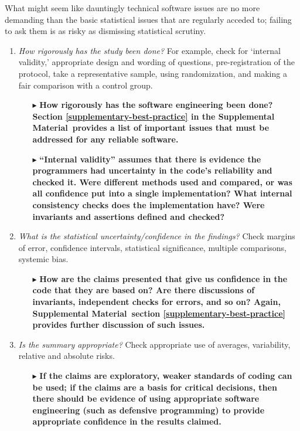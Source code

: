 \documentclass{article}
\def\supplement{Supplemental Material}
\begin{document}
What might seem like dauntingly technical software issues are no more demanding than the basic statistical issues that are regularly acceded to; failing to ask them is as risky as dismissing statistical scrutiny.

\def\questionsection#1{\changemysubsection{#1}}
\def\question#1{\item \emph{#1\/}}
\def\sequestion#1{\begin{itemize}\raggedright\item[$\blacktriangleright$] \textbf{#1}\end{itemize}}

\questionsection{How trustworthy are the numbers?}

\begin{enumerate}
\question{How rigorously has the study been done?} For example, check for `internal validity,' appropriate design and wording of questions, pre-registration of the protocol, take a representative sample, using randomization, and making a fair comparison with a control group.

\sequestion{How rigorously has the software engineering been done? Section \ref{supplementary-best-practice} in the \supplement\ provides a list of important issues that must be addressed for any reliable software.}

\sequestion{``Internal validity'' assumes that there is evidence the programmers had uncertainty in the code's reliability and checked it. Were different methods used and compared, or was all confidence put into a single implementation? What internal consistency checks does the implementation have? Were invariants and assertions defined and checked? }

\question{What is the statistical uncertainty/confidence in the findings?} Check margins of error, confidence intervals, statistical significance, multiple comparisons, systemic bias.

\sequestion{How are the claims presented that give us confidence in the code that they are based on? Are there discussions of invariants, independent checks for errors, and so on? Again, \supplement\ section \ref{supplementary-best-practice} provides further discussion of such issues.}


\question{Is the summary appropriate?} Check appropriate use of averages, variability, relative and absolute risks.

\sequestion{If the claims are exploratory, weaker standards of coding can be used; if the claims are a basis for critical decisions, then there should be evidence of using appropriate software engineering (such as defensive programming) to provide appropriate confidence in the results claimed.}
\setcounter{resumeCounter}{\value{enumi}}
\end{enumerate}
\end{document}
